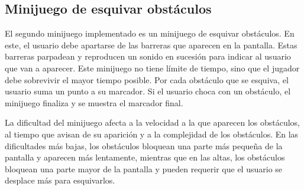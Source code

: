 \subsection{Minijuego de esquivar obstáculos}
\label{sec:minijuego-esquivar}
El segundo minijuego implementado es un minijuego de esquivar obstáculos. En este, el usuario
debe apartarse de las barreras que aparecen en la pantalla. Estas barreras parpadean y reproducen
un sonido en sucesión para indicar al usuario que van a aparecer. Este minijuego no tiene límite
de tiempo, sino que el jugador debe sobrevivir el mayor tiempo posible. Por cada obstáculo que se
esquiva, el usuario suma un punto a su marcador. Si el usuario choca con un obstáculo, el minijuego
finaliza y se muestra el marcador final.

La dificultad del minijuego afecta a la velocidad a la que aparecen los obstáculos, al tiempo que
avisan de su aparición y a la complejidad de los obstáculos. En las dificultades más bajas, los
obstáculos bloquean una parte más pequeña de la pantalla y aparecen más lentamente, mientras que en
las altas, los obstáculos bloquean una parte mayor de la pantalla y pueden requerir que el usuario
se desplace más para esquivarlos.


